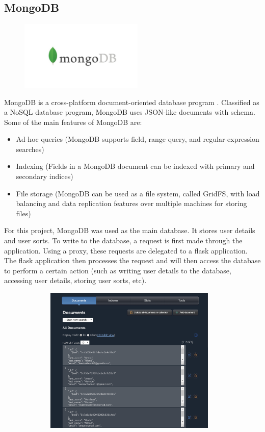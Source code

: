 \newpage
\subsection{MongoDB}
\par
\medskip
\begin{center}
    \includegraphics[width=8cm,height=3.3cm,keepaspectratio]{images/mongodb}
\end{center}
MongoDB is a cross-platform document-oriented database program \cite{mongo_docs}. Classified as a
NoSQL database program, MongoDB uses JSON-like documents with schema. Some of 
the main features of MongoDB are:

\begin{itemize}
    \item Ad-hoc queries (MongoDB supports field, range query, and
    regular-expression searches)
    \item Indexing (Fields in a MongoDB document can be indexed with primary and
    secondary indices)
    \item File storage (MongoDB can be used as a file system, called GridFS,
    with load balancing and data replication features over multiple machines for
    storing files)  
\end{itemize}

For this project, MongoDB was used as the main database. It stores user details
and user sorts. To write to the database, a request is first made through the 
application. Using a proxy, these requests are delegated to a flask application.
The flask application then processes the request and will then access the 
database to perform a certain action (such as writing user details to the 
database, accessing user details, storing user sorts, etc). 

\begin{center}
    \includegraphics[width=13cm,height=7cm,keepaspectratio]{images/mlab}
\end{center}

